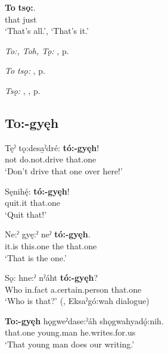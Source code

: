\ea
\label{ex:tpart103}
\gll \textbf{To} \textbf{tsǫ:}.\\
that just\\
\glt ‘That’s all.’, ‘That’s it.’
\z

\begin{CayugaRelated}
\item \textit{To:, Toh, Tǫ:} , p. \pageref{p:[to:] ‘that one’}\\
\item \textit{To tsǫ:} , p. \pageref{p:[to tsǫ:] ‘that’s enough!’}\\
\item \textit{Tsǫ:} , , p. \pageref{p:[tsǫ:]}
\end{CayugaRelated}


\subsection*{\textbf{To:-gyęh} } \label{p:[to:-gyęh]}

\ea
\label{ex:tpart82}
\gll Tęˀ tǫ:desa̱ˀdré: \textbf{tó:-gyęh}!\\
not do.not.drive that.one\\
\glt ‘Don’t drive that one over here!’
\z

\ea
\label{ex:tpart83}
\gll Sęnihę́: \textbf{tó:-gyęh}!\\
quit.it that.one\\
\glt ‘Quit that!’
\z

\ea
\label{ex:tpart84}
\gll Ne:ˀ gyę:ˀ neˀ \textbf{tó:-gyęh}.\\
it.is this.one the that.one\\
\glt ‘That is the one.’
\z

\ea
\label{ex:tpart85}
\gll Sǫ: hne:ˀ nˀáht \textbf{tó:-gyęh}?\\
Who in.fact a.certain.person that.one\\
\glt ‘Who is that?’ (\cite[88]{mithun_watewayestanih_1984}, Eksaˀgó:wah dialogue)
\z

\ea
\label{ex:tpart86}
\gll \textbf{To:-gyęh} hǫgweˀdase:ˀáh shǫgwahyadǫ́:nih.\\
that.one young.man he.writes.for.us\\
\glt ‘That young man does our writing.’
\z

